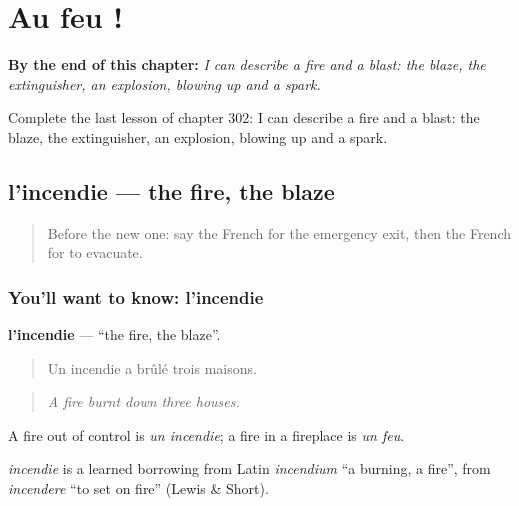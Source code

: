 
\chapter{Au feu !}
\label{ch:fr-au-feu}

\begin{chapteropening}
\textbf{By the end of this chapter:} \emph{I can describe a fire and a blast: the blaze, the extinguisher, an explosion, blowing up and a spark.}

Complete the last lesson of chapter 302: I can describe a fire and a blast: the blaze, the extinguisher, an explosion, blowing up and a spark.
\end{chapteropening}

\section[l'incendie]{l'incendie — the fire, the blaze}

\label{lesson:FR-C302-incendie}



\begin{quote}
Before the new one: say the French for the emergency exit, then the French for to evacuate.
\end{quote}

\subsection*{You'll want to know: l'incendie}
\textbf{l'incendie} — \textquotedblleft{}the fire, the blaze\textquotedblright{}.

\begin{quote}
Un incendie a brûlé trois maisons.
\end{quote}

\begin{quote}
\emph{A fire burnt down three houses.}
\end{quote}

A fire out of control is \emph{un incendie}; a fire in a fireplace is \emph{un feu}.

\begin{cousinweb}
\emph{incendie} is a learned borrowing from Latin \emph{incendium} \textquotedblleft{}a burning, a fire\textquotedblright{}, from \emph{incendere} \textquotedblleft{}to set on fire\textquotedblright{} (Lewis \& Short).
\end{cousinweb}

